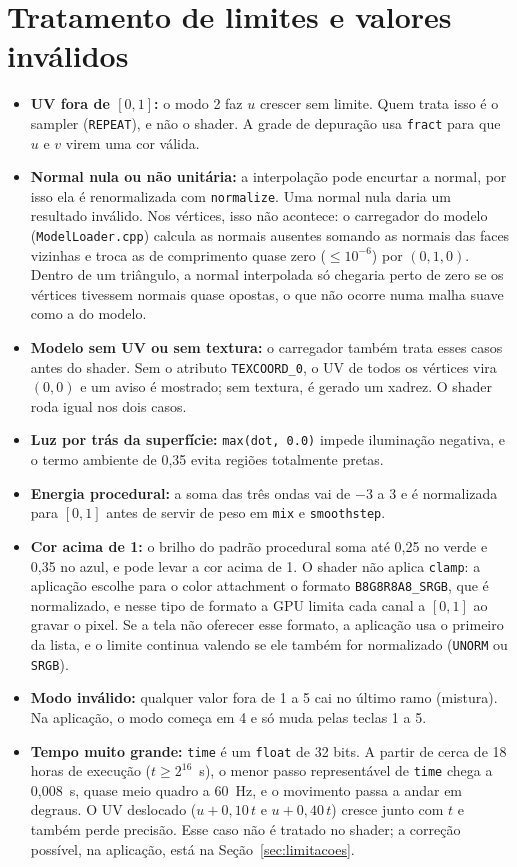 \section{Tratamento de limites e valores inválidos}

\begin{itemize}
    \item \textbf{UV fora de \([0,1]\):} o modo 2 faz \(u\) crescer sem limite. Quem trata isso é o sampler (\texttt{REPEAT}), e não o shader. A grade de depuração usa \texttt{fract} para que \(u\) e \(v\) virem uma cor válida.
    \item \textbf{Normal nula ou não unitária:} a interpolação pode encurtar a normal, por isso ela é renormalizada com \texttt{normalize}. Uma normal nula daria um resultado inválido. Nos vértices, isso não acontece: o carregador do modelo (\texttt{ModelLoader.cpp}) calcula as normais ausentes somando as normais das faces vizinhas e troca as de comprimento quase zero (\(\le 10^{-6}\)) por \((0,1,0)\). Dentro de um triângulo, a normal interpolada só chegaria perto de zero se os vértices tivessem normais quase opostas, o que não ocorre numa malha suave como a do modelo.
    \item \textbf{Modelo sem UV ou sem textura:} o carregador também trata esses casos antes do shader. Sem o atributo \texttt{TEXCOORD\_0}, o UV de todos os vértices vira \((0,0)\) e um aviso é mostrado; sem textura, é gerado um xadrez. O shader roda igual nos dois casos.
    \item \textbf{Luz por trás da superfície:} \texttt{max(dot, 0.0)} impede iluminação negativa, e o termo ambiente de 0,35 evita regiões totalmente pretas.
    \item \textbf{Energia procedural:} a soma das três ondas vai de \(-3\) a \(3\) e é normalizada para \([0,1]\) antes de servir de peso em \texttt{mix} e \texttt{smoothstep}.
    \item \textbf{Cor acima de 1:} o brilho do padrão procedural soma até 0,25 no verde e 0,35 no azul, e pode levar a cor acima de 1. O shader não aplica \texttt{clamp}: a aplicação escolhe para o color attachment o formato \texttt{B8G8R8A8\_SRGB}, que é normalizado, e nesse tipo de formato a GPU limita cada canal a \([0,1]\) ao gravar o pixel. Se a tela não oferecer esse formato, a aplicação usa o primeiro da lista, e o limite continua valendo se ele também for normalizado (\texttt{UNORM} ou \texttt{SRGB}).
    \item \textbf{Modo inválido:} qualquer valor fora de 1 a 5 cai no último ramo (mistura). Na aplicação, o modo começa em 4 e só muda pelas teclas 1 a 5.
    \item \textbf{Tempo muito grande:} \texttt{time} é um \texttt{float} de 32 bits. A partir de cerca de 18 horas de execução (\(t \ge 2^{16}\)~s), o menor passo representável de \texttt{time} chega a 0,008~s, quase meio quadro a 60~Hz, e o movimento passa a andar em degraus. O UV deslocado (\(u + 0{,}10\,t\) e \(u + 0{,}40\,t\)) cresce junto com \(t\) e também perde precisão. Esse caso não é tratado no shader; a correção possível, na aplicação, está na Seção~\ref{sec:limitacoes}.
\end{itemize}

